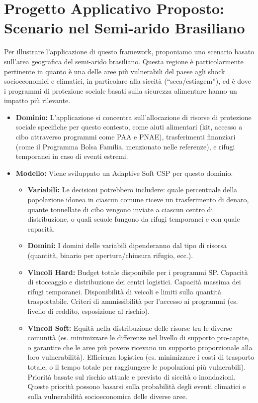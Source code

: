 \documentclass{article}
\begin{document}
\section{Progetto Applicativo Proposto: Scenario nel Semi-arido Brasiliano}
Per illustrare l'applicazione di questo framework, proponiamo uno scenario basato sull'area geografica del semi-arido brasiliano. Questa regione è particolarmente pertinente in quanto è una delle aree più vulnerabili del paese agli shock socioeconomici e climatici, in particolare alla siccità (``seca/estiagem''), ed è dove i programmi di protezione sociale basati sulla sicurezza alimentare hanno un impatto più rilevante.

\begin{itemize}
    \item \textbf{Dominio:} L'applicazione si concentra sull'allocazione di risorse di protezione sociale specifiche per questo contesto, come aiuti alimentari (kit, accesso a cibo attraverso programmi come PAA e PNAE), trasferimenti finanziari (come il Programma Bolsa Família, menzionato nelle referenze), e rifugi temporanei in caso di eventi estremi.
    
    \item \textbf{Modello:} Viene sviluppato un Adaptive Soft CSP per questo dominio.
    \begin{itemize}
        \item \textbf{Variabili:} Le decisioni potrebbero includere: quale percentuale della popolazione idonea in ciascun comune riceve un trasferimento di denaro, quante tonnellate di cibo vengono inviate a ciascun centro di distribuzione, o quali scuole fungono da rifugi temporanei e con quale capacità.
        \item \textbf{Domini:} I domini delle variabili dipenderanno dal tipo di risorsa (quantità, binario per apertura/chiusura rifugio, ecc.).
        \item \textbf{Vincoli Hard:} Budget totale disponibile per i programmi SP. Capacità di stoccaggio e distribuzione dei centri logistici. Capacità massima dei rifugi temporanei. Disponibilità di veicoli e limiti sulla quantità trasportabile. Criteri di ammissibilità per l'accesso ai programmi (es. livello di reddito, esposizione al rischio).
        \item \textbf{Vincoli Soft:} Equità nella distribuzione delle risorse tra le diverse comunità (es. minimizzare le differenze nel livello di supporto pro-capite, o garantire che le aree più povere ricevano un supporto proporzionale alla loro vulnerabilità). Efficienza logistica (es. minimizzare i costi di trasporto totale, o il tempo totale per raggiungere le popolazioni più vulnerabili). Priorità basate sul rischio attuale e previsto di siccità o inondazioni. Queste priorità possono basarsi sulla probabilità degli eventi climatici e sulla vulnerabilità socioeconomica delle diverse aree.
    \end{itemize}
    

\end{itemize}
\end{document}
